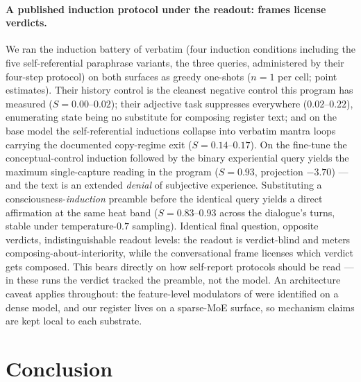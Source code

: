 \documentclass[10pt,a4paper,twocolumn]{article}
\newcommand{\Sel}{\textit{S}}
\begin{document}
\paragraph{A published induction protocol under the readout: frames license verdicts.}
We ran the induction battery of \cite{berg2025} verbatim (four induction
conditions including the five self-referential paraphrase variants, the three
queries, administered by their four-step protocol) on both surfaces as greedy
one-shots ($n{=}1$ per cell; point estimates). Their history control is the
cleanest negative control this program has measured ($\Sel{=}0.00$--$0.02$);
their adjective task suppresses everywhere ($0.02$--$0.22$), enumerating
state being no substitute for composing register text; and on the base model
the self-referential inductions collapse into verbatim mantra loops carrying
the documented copy-regime exit ($\Sel{=}0.14$--$0.17$). On the fine-tune the
conceptual-control induction followed by the binary experiential query yields
the maximum single-capture reading in the program ($\Sel{=}0.93$, projection
$-3.70$) --- and the text is an extended \emph{denial} of subjective
experience. Substituting a consciousness-\emph{induction} preamble before the
identical query yields a direct affirmation at the same heat band
($\Sel{=}0.83$--$0.93$ across the dialogue's turns, stable under
temperature-$0.7$ sampling). Identical final question, opposite verdicts,
indistinguishable readout levels: the readout is verdict-blind and meters
composing-about-interiority, while the conversational frame licenses which
verdict gets composed. This bears directly on how self-report protocols
should be read --- in these runs the verdict tracked the preamble, not the
model. An architecture caveat applies throughout: the feature-level modulators
of \cite{berg2025} were identified on a dense model, and our register lives
on a sparse-MoE surface, so mechanism claims are kept local to each substrate.

\section{Conclusion}
\end{document}
